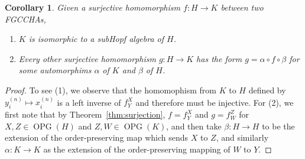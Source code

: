 \documentclass[11pt]{amsart}
\newtheorem{corollary}[theorem]{Corollary}
\theoremstyle{definition}
\numberwithin{equation}{section}
\newcommand{\FGCCHAs}{\textsf{FGCCHA}s\xspace}
\newcommand{\OPG}{\operatorname{OPG}}
\begin{document}
\begin{corollary}
Given a surjective homomorphism $f: H \to K$ between two \FGCCHAs,
\begin{enumerate}
\item $K$ is isomorphic to a subHopf algebra of $H$.

\item Every other surjective homomorphism $g: H \to K$ has the form $g = \alpha \circ f \circ \beta$ for some automorphims $\alpha$ of $K$ and $\beta$ of $H$.

\end{enumerate}
\end{corollary}
\begin{proof}
To see (1), we observe that the homomophism from $K$ to $H$ defined by $y^{(n)}_{i} \mapsto x^{(n)}_{i}$ is a left inverse of $f^{X}_{Y}$ and therefore must be injective.  For (2), we first note that by Theorem~\ref{thm:surjection}, $f = f^{X}_{Y}$ and $g = f^{Z}_{W}$ for $X, Z \in \OPG(H)$ and $Z, W \in \OPG(K)$, and then take $\beta: H \to H$ to be the extension of the order-preserving map which sends $X$ to $Z$, and similarly $\alpha: K \to K$ as the extension of the order-preserving mapping of $W$ to $Y$.
\end{proof}
\end{document}
